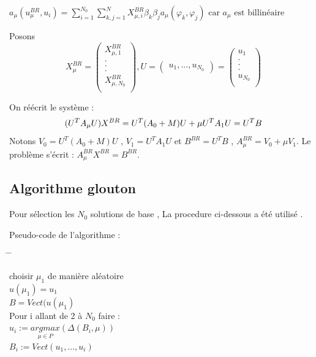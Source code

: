 \documentclass[12pt]{article}
\begin{document}
$
a_{\mu}(u^{BR}_{\mu},u_i) = \sum_{i= 1}^{N_0}
\sum_{k,j= 1}^{N} X^{BR}_{\mu,i} 
\beta_k \beta_j a_\mu(\varphi_{k},\varphi_{j}) \text{  car $a_{\mu}$ est billinéaire}
$


Posons
$$
X^{BR}_{\mu}  = \begin{pmatrix}
X^{BR}_{\mu,1} \\
. \\
. \\
. \\
X^{BR}_{\mu,N_0} \\
\end{pmatrix} , 
U = \begin{pmatrix}
u_1 , ... , u_{N_0}
\end{pmatrix} = \begin{pmatrix}
u_1 \\
. \\
. \\
. \\
u_{N_0} \\ 
\end{pmatrix}
$$


On   réécrit le système  :
$$
(U^{T}A_{\mu}U )X^{BR} = 
U^{T}(A_0 + M)U + \mu U^{T}A_1U = U^{T}B \\
$$
Notons $V_0 = U^{T}(A_0 + M)U$ ,  $V_1 = U^{T}A_1U$ et $B^{BR} = U^{T}B$ , $A^{BR}_{\mu} = V_0 + \mu V_1$.
Le problème s'écrit : $A^{BR}_{\mu} X^{BR} = B^{BR} $. 



\subsection {Algorithme glouton  }

Pour sélection les $N_0$ solutions de base , La procedure ci-dessous a été utilisé .



Pseudo-code de l'algorithme  :


    
\begin{tabbing}
\hspace{1cm} \= \hspace{1cm} \= \kill

choisir $\mu_1 $ de manière aléatoire \\
$u(\mu_1) = u_1$ \\
$B = Vect(u(\mu_1)$ \\
Pour i allant de 2 à ${N_0}$ faire :\\
\>    $u_i := \underset{\mu \in P}{argmax }(\Delta(B_i,\mu))$ \\
\>     $B_i := Vect(u_1,...,u_i)$
\end{tabbing}
\end{document}
